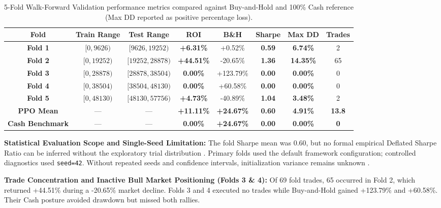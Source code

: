 \documentclass[11pt,a4paper]{article}
\begin{document}
\begin{table}[H]
\centering
\footnotesize
\begin{tabularx}{\textwidth}{c c c c c c c c}
\toprule
\textbf{Fold} & \textbf{Train Range} & \textbf{Test Range} & \textbf{ROI} & \textbf{B\&H} & \textbf{Sharpe} & \textbf{Max DD} & \textbf{Trades} \\
\midrule
\textbf{Fold 1} & $[0,9626)$ & $[9626,19252)$ & \textbf{+6.31\%} & +0.52\% & \textbf{0.59} & \textbf{6.74\%} & 2 \\
\textbf{Fold 2} & $[0,19252)$ & $[19252,28878)$ & \textbf{+44.51\%} & -20.65\% & \textbf{1.36} & \textbf{14.35\%} & 65 \\
\textbf{Fold 3} & $[0,28878)$ & $[28878,38504)$ & \textbf{0.00\%} & +123.79\% & \textbf{0.00} & \textbf{0.00\%} & 0 \\
\textbf{Fold 4} & $[0,38504)$ & $[38504,48130)$ & \textbf{0.00\%} & +60.58\% & \textbf{0.00} & \textbf{0.00\%} & 0 \\
\textbf{Fold 5} & $[0,48130)$ & $[48130,57756)$ & \textbf{+4.73\%} & -40.89\% & \textbf{1.04} & \textbf{3.48\%} & 2 \\
\midrule
\textbf{PPO Mean} & --- & --- & \textbf{+11.11\%} & \textbf{+24.67\%} & \textbf{0.60} & \textbf{4.91\%} & \textbf{13.8} \\
\textbf{Cash Benchmark} & --- & --- & \textbf{0.00\%} & \textbf{+24.67\%} & \textbf{0.00} & \textbf{0.00\%} & \textbf{0} \\
\bottomrule
\end{tabularx}
\caption{5-Fold Walk-Forward Validation performance metrics compared against Buy-and-Hold and 100\% Cash reference (Max DD reported as positive percentage loss).}
\label{tab:wfv_results}
\end{table}

\textbf{Statistical Evaluation Scope and Single-Seed Limitation:}
The fold Sharpe mean was 0.60, but no formal empirical Deflated Sharpe Ratio can be inferred without the exploratory trial distribution \cite{bailey2014dsr}. Primary folds used the default framework configuration; controlled diagnostics used \texttt{seed=42}. Without repeated seeds and confidence intervals, initialization variance remains unknown \cite{henderson2018}.

\textbf{Trade Concentration and Inactive Bull Market Positioning (Folds 3 \& 4):}
Of 69 fold trades, 65 occurred in Fold 2, which returned +44.51\% during a -20.65\% market decline. Folds 3 and 4 executed no trades while Buy-and-Hold gained +123.79\% and +60.58\%. Their Cash posture avoided drawdown but missed both rallies.
\end{document}
